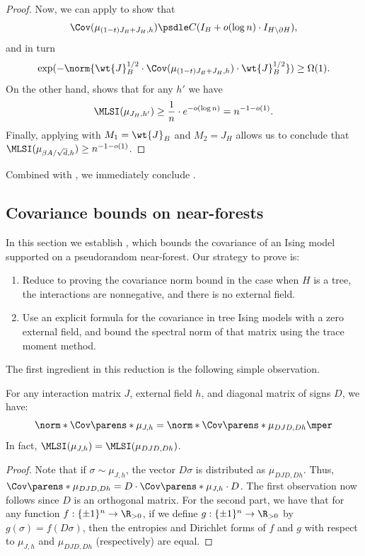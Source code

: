 \documentclass[11pt,letterpaper]{article}
\begin{document}
\begin{proof}
        Now, we can apply  to show that 
        \[ 
            \Cov(\mu_{(1-t)J_B + J_H,h}) \psdle C (I_B + o(\log n) \cdot I_{H \setminus \partial H}), 
        \]
        and in turn 
        \[
            \exp(-\norm{\wt{J}_B^{1/2} \cdot \Cov(\mu_{(1-t)J_B + J_H,h}) \cdot \wt{J}_B^{1/2}}) \ge \Omega(1).
        \]
        On the other hand,  shows that for any $h'$ we have 
        \[
            \MLSI(\mu_{J_H, h'}) \ge \frac{1}{n} \cdot e^{-o(\log n)} = n^{-1-o(1)}.
        \] 
        Finally, applying  with $M_1 = \wt{J}_B$ and $M_2 = J_H$ allows us to conclude that $\MLSI(\mu_{\beta A/\sqrt{d}, h}) \ge n^{-1 - o(1)}$.
    \end{proof}
    Combined with , we immediately conclude .

    \subsection{Covariance bounds on near-forests}\label{sec:covariance-near-forest}
    In this section we establish , which bounds the covariance of an Ising model supported on a pseudorandom near-forest.
    \nearforestcov*
    Our strategy to prove  is:
    \begin{enumerate}
        \item Reduce to proving the covariance norm bound in the case when $H$ is a tree, the interactions are nonnegative, and there is no external field.
        \item Use an explicit formula for the covariance in tree Ising models with a zero external field, and bound the spectral norm of that matrix using the trace moment method.
    \end{enumerate}
    The first ingredient in this reduction is the following simple observation.
    \begin{observation} \label{obs:sign-conjugation}
        For any interaction matrix $J$, external field $h$, and diagonal matrix of signs $D$, we have:
        \[
            \norm*{\Cov\parens*{\mu_{J,h}}} = \norm*{\Cov\parens*{\mu_{DJD, Dh}}}\mper
        \]
        In fact, $\MLSI(\mu_{J,h}) = \MLSI(\mu_{DJD,Dh})$.
    \end{observation}
    \begin{proof}
        Note that if $\sigma\sim\mu_{J,h}$, the vector $D\sigma$ is distributed as $\mu_{DJD,Dh}$.
        Thus, $\Cov\parens*{\mu_{DJD,Dh}} = D\cdot\Cov\parens*{\mu_{J,h}}\cdot D$. The first observation now follows since $D$ is an orthogonal matrix. For the second part, we have that for any function $f : \{\pm 1\}^n \to \R_{>0}$, if we define $g : \{\pm 1\}^n \to \R_{>0}$ by $g(\sigma) = f(D\sigma)$, then the entropies and Dirichlet forms of $f$ and $g$ with respect to $\mu_{J,h}$ and $\mu_{DJD,Dh}$ (respectively) are equal.
    \end{proof}
\end{document}
